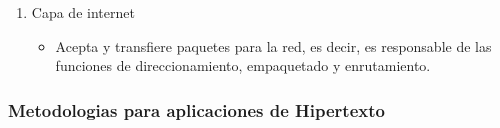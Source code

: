 \documentclass[11pt]{article}
\begin{document}
\begin{enumerate}
\begin{enumerate}
\begin{enumerate}
\begin{enumerate}
\begin{enumerate}
\item Capa de internet
\begin{itemize}
\item Acepta y transfiere paquetes para la red, es decir, es responsable de las funciones de direccionamiento, empaquetado y enrutamiento.
\end{itemize}
\end{enumerate}
\end{enumerate}
\end{enumerate}
\end{enumerate}
\end{enumerate}
\subsubsection{Metodologias para aplicaciones de Hipertexto}
\label{sec:org8c7d919}
\end{document}
